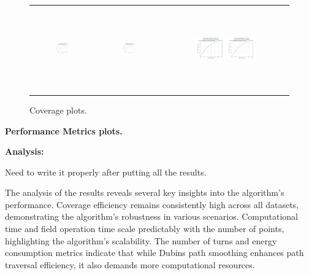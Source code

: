 \begin{figure}[p]
\begin{tabular}{ccc}
        \includegraphics[height=36mm,width=0.24\textwidth]{Images/simulation_no_obs/coverage_plots/51.png}
        & \includegraphics[height=36mm,width=0.24\textwidth]{Images/simulation_no_obs/coverage_plots/52.png}
        & \includegraphics[height=36mm,width=0.24\textwidth]{Images/simulation_no_obs/coverage_plots/53.png}
        \includegraphics[height=36mm,width=0.24\textwidth]{Images/simulation_no_obs/coverage_plots/54.png}\\[-4pt]

    \end{tabular}
    \caption{Coverage plots.\label{fig:coverage_plots}}
    \end{figure}


\textbf{Performance Metrics plots.}  



\textbf{Analysis: }

Need to write it properly after putting all the results.   

The analysis of the results reveals several key insights into the algorithm's performance. Coverage efficiency remains consistently high across all datasets, demonstrating the algorithm's robustness in various scenarios. Computational time and field operation time scale predictably with the number of points, highlighting the algorithm's scalability. The number of turns and energy consumption metrics indicate that while Dubins path smoothing enhances path traversal efficiency, it also demands more computational resources. 

